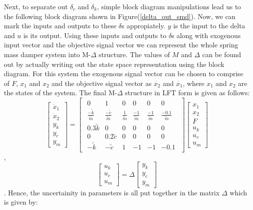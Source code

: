 \documentclass[a4paper,12pt]{article}
\begin{document}
				Next, to separate out $\delta_{c}$ and $\delta_{k}$, simple block diagram manipulations lead us to the following block diagram shown in Figure(\ref{delta_out_smd}). Now, we can mark the inputs and outputs to these $\delta$s appropiately. $y$ is the input to the delta and $u$ is its output. Using these inputs and outputs to $\delta$s along with exogenous input vector and the objective signal vector we can represent the whole spring mass damper system into M-$\Delta$ structure. The values of $M$ and $\Delta$ can be found out by actually writing out the state space representation using the block diagram. For this system the exogenous signal vector can be chosen to comprise of $F$, $x_{1}$ and $x_{2}$ and the objective signal vector as $\dot{x_{2}}$ and $\dot{x_{1}}$, where $x_{1}$ and $x_{2}$ are the states of the system. The final M-$\Delta$ structure in LFT form is given as follows:
			\[
			\begin{bmatrix}
				\dot{x}_{1}\\
				\dot{x}_{2}\\
				\hline
				y_{k}\\
				y_{c}\\
				y_{m}
			\end{bmatrix}
			=
			\begin{bmatrix}
				\begin{array}{ccc|ccc}
					0 & 1 & 0 & 0 & 0 & 0 \\
					\frac{-\tilde{k}}{\tilde{m}} & \frac{-\tilde{c}}{\tilde{m}} & \frac{1}{\tilde{m}} & \frac{-1}{\tilde{m}} & \frac{-1}{\tilde{m}} & \frac{-0.1}{\tilde{m}} \\ \hline
					0.3\tilde{k} & 0 & 0 & 0 & 0 & 0\\
					0 & 0.2\tilde{c} & 0 & 0 & 0 & 0 \\
					-\tilde{k} & -\tilde{c} & 1 & -1 & -1 & -0.1
				\end{array}
			\end{bmatrix}
			\begin{bmatrix}
			x_{1}\\
			x_{2}\\
			F\\ \hline
			u_{k}\\
			u_{c}\\
			u_{m}
			\end{bmatrix}
			\],
			\[
			\begin{bmatrix}
			u_{k}\\
			u_{c}\\
			u_{m}
			\end{bmatrix}
			= \Delta
			\begin{bmatrix}
				y_{k}\\
				y_{c}\\
				y_{m}
			\end{bmatrix}
			\]. Hence, the uncertainity in parameters is all put together in the matrix $\Delta$ which is given by:
\end{document}
